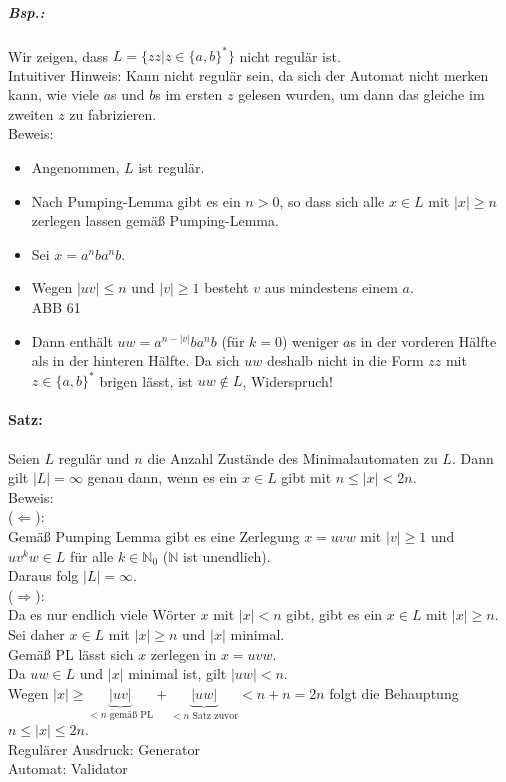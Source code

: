\subparagraph{Bsp.:} Wir zeigen, dass $L=\{zz|z\in \{a,b\}^*\}$ nicht regulär ist.\\
Intuitiver Hinweis: Kann nicht regulär sein, da sich der Automat nicht merken kann, wie viele $a$s und $b$s im ersten $z$ gelesen wurden, um dann das gleiche im zweiten $z$ zu fabrizieren.\\
Beweis: 
\begin{itemize}
\item Angenommen, $L$ ist regulär.
\item Nach Pumping-Lemma gibt es ein $n>0$, so dass sich alle $x \in L$ mit $|x|\geq n$ zerlegen lassen gemäß Pumping-Lemma.
\item Sei $x=a^nb a^nb$.
\item Wegen $|uv|\leq n$ und $|v|\geq 1$ besteht $v$ aus mindestens einem $a$.\\
ABB 61
\item Dann enthält $uw=a^{n-|v|}ba^nb$ (für $k=0$) weniger $a$s in der vorderen Hälfte als in der hinteren Hälfte. Da sich $uw$ deshalb nicht in die Form $zz$ mit $z\in \{a,b\}^*$ brigen lässt, ist $uw \not \in L$, Widerspruch!
\end{itemize}

\paragraph{Satz:} Seien $L$ regulär und $n$ die Anzahl Zustände des Minimalautomaten zu $L$. Dann gilt $|L| = \infty$ genau dann, wenn es ein $x \in L$ gibt mit $n\leq  |x| < 2n$.\\
Beweis:\\
($\Leftarrow$):\\
Gemäß Pumping Lemma gibt es eine Zerlegung $x=uvw$ mit $|v| \geq 1$ und $uv^kw\in L$ für alle $k \in \mathbb{N}_0$ ($\mathbb{N}$ ist unendlich).\\
Daraus folg $|L|=\infty$.\\
($\Rightarrow$):\\
Da es nur endlich viele Wörter $x$ mit $|x|<n$ gibt, gibt es ein $x\in L$ mit $|x|\geq n$.\\
Sei daher $x\in L$ mit $|x| \geq n$ und $|x|$ minimal.\\
Gemäß PL lässt sich $x$ zerlegen in $x=uvw$.\\
Da $uw \in L$ und $|x|$ minimal ist, gilt $|uw|<n$.\\
Wegen $|x|\geq \underbrace{|uv|}_{<n \text{ gemäß PL}}+\underbrace{|uw|}_{<n \text{ Satz zuvor}}<n+n=2n$ folgt die Behauptung $n \leq |x| \leq 2n$. \\
Regulärer Ausdruck: Generator\\
Automat: Validator
